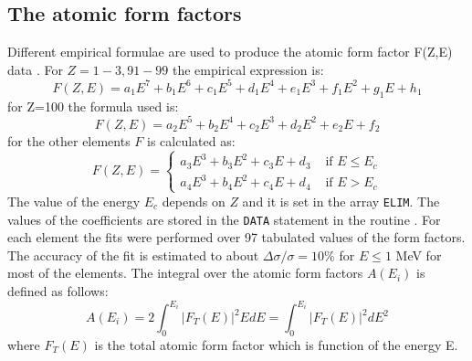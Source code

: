 \subsection{The atomic form factors}
Different empirical formulae are used to produce the atomic form factor
F(Z,E) data \cite{bib-STOR}. For $Z = 1-3, 91-99$ the empirical expression is:
\begin{equation}
F \left( Z,E \right) = a_1 E^7 + b_1 E^6 + c_1 E^5 + d_1 E^4 + e_1 E^3
+ f_1 E^2 + g_1 E + h_1
\end{equation}
for Z=100 the formula used is:
\begin{equation}
F \left( Z,E \right) = a_2 E^5 + b_2 E^4 + c_2 E^3 + d_2 E^2 + e_2 E + f_2
\end{equation}
for the other elements $F$ is calculated as:
\begin{equation}
F \left( Z,E \right) = \left\{ \begin{array}{ll}
            a_3 E^3 + b_3 E^2 + c_3 E + d_3 & \mbox{ if } E \leq E_c   \\
            a_4 E^3 + b_4 E^2 + c_4 E + d_4 & \mbox{ if } E > E_c 
                              \end{array} \right .
\end{equation}
The value of the energy $ E_c $ depends on $Z$ and it is set in the
array {\tt ELIM}. The values of the coefficients are stored in the 
{\tt DATA} statement in the routine . For each element 
the fits were performed over 97 tabulated
values of the form factors. The accuracy of the
fit is estimated to about $\Delta \sigma/\sigma = 10\%$
for $E \leq 1$ MeV for most of the elements.
The integral over the atomic form factors 
$ A \left( E_i \right)$ is defined as follows:
\begin{equation}
A \left( E_i \right) = 2 \int_{0}^{E_i} {\left| F_T \left( E \right)
 \right|}^2 E dE = \int_{0}^{E_i}{\left| F_T \left( E \right) \right |}^2
dE^2
\end{equation}
where $ F_T \left( E \right) $ is the total atomic form factor which is
function of the energy E.
